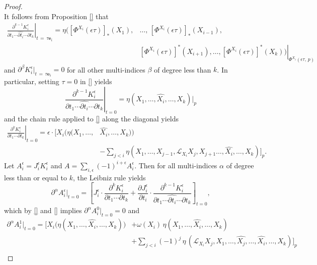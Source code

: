 \begin{proof}
\begin{equation}
  \end{equation}
  It follows from Proposition \ref{} that 
  \begin{align}
    \left.\frac{\partial^{k-1} K_i^\epsilon}{\partial t_1 \cdots \widehat{\partial t_i} \cdots \partial t_{k}}\right|_{t\,=\,\tau \mathbf{e}_i} = \eta \Big( [\Phi^{X_i}(\epsilon\tau)]_*(X_1), &\ldots,\, [\Phi^{X_i}(\epsilon\tau)]_*(X_{i-1}), \\ 
    &\left.[\Phi^{X_i}(\epsilon\tau)]^*(X_{i+1}), \ldots, [\Phi^{X_i}(\epsilon \tau)]^*(X_k) \Big)\right|_{\Phi^{X_i}(\epsilon\tau\!,\, p)} \nonumber
  \end{align}
  and $\partial^\beta K_i^\epsilon|_{t \, = \, \tau \mathbf{e}_i} = 0$ for all other multi-indices $\beta$ of degree less than $k$. In particular, setting $\tau = 0$ in \eqref{} yields
  \begin{equation}
  \left.\frac{\partial^{k-1} K_i^\epsilon}{\partial t_1 \cdots \widehat{\partial t_i} \cdots \partial t_k}\right|_{t = 0} = \eta(X_1, \ldots, \widehat{X_i}, \ldots, X_k)|_p
  \end{equation}
  and the chain rule applied to \eqref{} along the diagonal yields
  \begin{align}
    \left. \frac{\partial^k K_i^\epsilon}{\partial t_1 \cdots \partial t_k}\right|_{t = 0}
    = \epsilon \cdot \Bigg[X_i \Big(\eta(X_1, \ldots, &\widehat{X_i}, \ldots, X_k)\Big)  \\ &- \sum_{j < i} \eta(X_1, \ldots, X_{j-1}, \mathcal{L}_{X_i} X_j, X_{j+1} \ldots, \widehat{X_i}, \ldots, X_k)\Bigg]_p.
  \end{align}
  Let $A_i^\epsilon = J_i^\epsilon K_i^\epsilon$ and $A = \sum_{i, \epsilon} (-1)^{i+\epsilon} A_i^\epsilon$. Then for all multi-indices $\alpha$ of degree less than or equal to $k$, the Leibniz rule yields
  \begin{equation}
    \partial^\alpha A_i^\epsilon |_{t = 0} = \left[J_i^\epsilon \cdot \frac{\partial^k K_i^\epsilon}{\partial t_1 \cdots \partial t_k} + \frac{\partial J_i^\epsilon}{\partial t_i} \cdot \frac{\partial^{k-1} K_i^\epsilon}{\partial t_1 \cdots \widehat{\partial t_i} \cdots \partial t_k}\right]_{t = 0},
  \end{equation}
  which by \eqref{} and \eqref{} implies $\partial^\alpha A_i^0|_{t = 0} = 0$ and
  \begin{align}
    \partial^\alpha A_i^1|_{t = 0}
    = \Bigg[X_i\Big(\eta(X_1, \ldots, \widehat{X_i}, \ldots, X_k)\Big) &+ \omega(X_i) \, \eta(X_1, \ldots, \widehat{X_i}, \ldots, X_k) \\ &+ \sum_{j < i} (-1)^j  \,\eta\,(\mathcal{L}_{X_i} X_j, X_1, \ldots, \widehat{X_j}, \ldots, \widehat{X_i}, \ldots, X_k)\Bigg]_p \nonumber \\ 

\end{align}
\end{proof}
